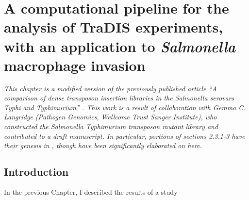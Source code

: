 
\chapter{A computational pipeline for the analysis of TraDIS experiments, with an application to {\it Salmonella} macrophage invasion}
\label{sec:chapterPingpong}
\ifpdf
    \graphicspath{{Chapter3/Chapter3Figs/EPS/}{Chapter3/Chapter3Figs/}}
\fi

\textit{This chapter is a modified version of the previously published article ``A comparison of dense transposon insertion libraries in the \emph{Salmonella} serovars Typhi and Typhimurium'' \parencite{Barquist2013a}. This work is a result of collaboration with Gemma C. Langridge (Pathogen Genomics, Wellcome Trust Sanger Institute), who constructed the \emph{Salmonella} Typhimurium transposon mutant library and contributed to a draft manuscript. In particular, portions of sections 2.3.1-3 have their genesis in \textcite{Langridge2010}, though have been significantly elaborated on here.}

\section{Introduction}

In the previous Chapter, I described the results of a study
